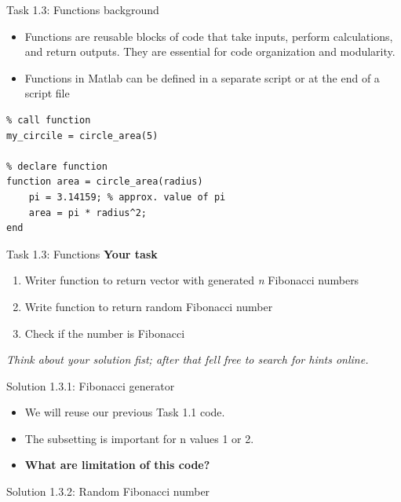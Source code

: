 \begin{frame}[fragile]{Task 1.3: Functions background }
\begin{itemize}
    \item Functions are reusable blocks of code that take inputs, perform calculations, and return outputs. They are essential for code organization and modularity. 
    \item Functions in Matlab can be defined in a separate script or at the end of a script file 
\end{itemize}
    
\begin{lstlisting}
% call function
my_circile = circle_area(5)

% declare function
function area = circle_area(radius)
    pi = 3.14159; % approx. value of pi
    area = pi * radius^2; 
end
\end{lstlisting}
\end{frame}

\begin{frame}{Task 1.3: Functions}
\textbf{Your task}
\begin{enumerate}
    \item Writer function to return vector with generated \textit{n} Fibonacci numbers
    \item Write function to return random Fibonacci number 
    \item Check if the number is Fibonacci 
\end{enumerate}
\vspace{1em}
\textit{Think about your solution fist; after that fell free to search for hints online.}   
\end{frame}

\begin{frame}[fragile]{Solution 1.3.1: Fibonacci generator}
\small
\begin{itemize}
    \item We will reuse our previous Task 1.1 code.
    \item  The subsetting is important for n values 1 or 2. 
    \item \textbf{What are limitation of this code?}
\end{itemize}

\vfill


\end{frame}

\begin{frame}[fragile]{Solution 1.3.2: Random Fibonacci number}
\footnotesize

\end{frame}

